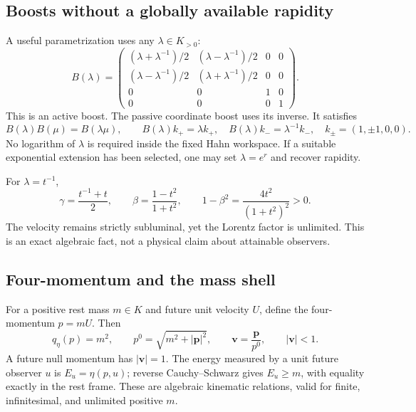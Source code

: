 \documentclass[11pt,letterpaper]{article}
\theoremstyle{definition}
\theoremstyle{remark}
\begin{document}
\subsection{Boosts without a globally available rapidity}
A useful parametrization uses any $\lambda\in K_{>0}$:
\begin{equation}\label{vtf:mink:eq:boostlambda}
 B(\lambda)=
 \begin{pmatrix}
 (\lambda+\lambda^{-1})/2&(\lambda-\lambda^{-1})/2&0&0\\
 (\lambda-\lambda^{-1})/2&(\lambda+\lambda^{-1})/2&0&0\\
 0&0&1&0\\0&0&0&1
 \end{pmatrix}.
\end{equation}
This is an active boost. The passive coordinate boost uses its inverse. It satisfies
\begin{equation}
 B(\lambda)B(\mu)=B(\lambda\mu),\qquad
 B(\lambda)k_+=\lambda k_+,\quad
 B(\lambda)k_-=\lambda^{-1}k_-,
 \quad k_\pm=(1,\pm1,0,0).
\end{equation}
No logarithm of $\lambda$ is required inside the fixed Hahn workspace. If a suitable exponential extension has been selected, one may set $\lambda=e^r$ and recover rapidity.

For $\lambda=t^{-1}$,
\begin{equation}\label{vtf:mink:eq:infiniteboost}
 \gamma=\frac{t^{-1}+t}{2},\qquad
 \beta=\frac{1-t^2}{1+t^2},\qquad
 1-\beta^2=\frac{4t^2}{(1+t^2)^2}>0.
\end{equation}
The velocity remains strictly subluminal, yet the Lorentz factor is unlimited. This is an exact algebraic fact, not a physical claim about attainable observers.

\subsection{Four-momentum and the mass shell}
For a positive rest mass $m\in K$ and future unit velocity $U$, define the four-momentum $p=mU$. Then
\begin{equation}
 q_\eta(p)=m^2,\qquad p^0=\sqrt{m^2+|\mathbf p|^2},
 \qquad \mathbf v=\frac{\mathbf p}{p^0},\qquad |\mathbf v|<1.
\end{equation}
A future null momentum has $|\mathbf v|=1$. The energy measured by a unit future observer $u$ is $E_u=\eta(p,u)$; reverse Cauchy--Schwarz gives $E_u\geq m$, with equality exactly in the rest frame. These are algebraic kinematic relations, valid for finite, infinitesimal, and unlimited positive $m$.
\end{document}
